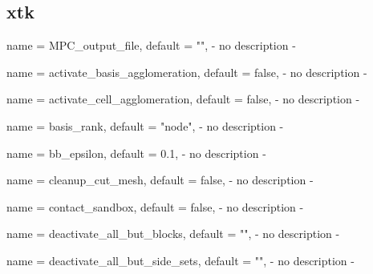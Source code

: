 \subsection{xtk}

\begin{parameter}{
    name    = {MPC_output_file},
    default = {""},
}
- no description -
\end{parameter}

\begin{parameter}{
    name    = {activate_basis_agglomeration},
    default = {false},
}
- no description -
\end{parameter}

\begin{parameter}{
    name    = {activate_cell_agglomeration},
    default = {false},
}
- no description -
\end{parameter}

\begin{parameter}{
    name    = {basis_rank},
    default = {"node"},
}
- no description -
\end{parameter}

\begin{parameter}{
    name    = {bb_epsilon},
    default = {0.1},
}
- no description -
\end{parameter}

\begin{parameter}{
    name    = {cleanup_cut_mesh},
    default = {false},
}
- no description -
\end{parameter}

\begin{parameter}{
    name    = {contact_sandbox},
    default = {false},
}
- no description -
\end{parameter}

\begin{parameter}{
    name    = {deactivate_all_but_blocks},
    default = {""},
}
- no description -
\end{parameter}

\begin{parameter}{
    name    = {deactivate_all_but_side_sets},
    default = {""},
}
- no description -
\end{parameter}

